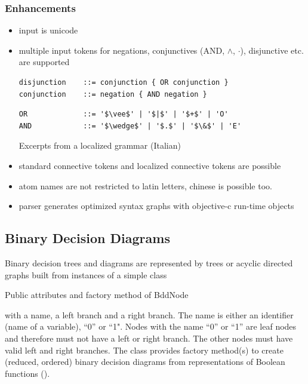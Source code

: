 \subsubsection{Enhancements}

\begin{itemize}

\item input is unicode

\item multiple input tokens for negations, conjunctives (AND, $\wedge$, $\cdot$), disjunctive etc. are supported 

\begin{table}[htdp]
\begin{center}
\begin{lstlisting}[mathescape,firstnumber=7]
disjunction    ::= conjunction { OR conjunction }
conjunction    ::= negation { AND negation }
\end{lstlisting}
\begin{lstlisting}[mathescape,firstnumber=15]
OR             ::= '$\vee$' | '$|$' | '$+$' | 'O'
AND            ::= '$\wedge$' | '$.$' | '$\&$' | 'E'
\end{lstlisting}
\caption{Excerpts from a localized grammar (Italian)}
\label{tab:LocalizedEBNF}
\end{center}
\end{table}

\item 

standard connective tokens and localized connective tokens are possible

\item atom names are not restricted to latin letters, chinese is possible too.

\item parser generates optimized syntax graphs with objective-c run-time objects

\end{itemize}




\subsection{Binary Decision Diagrams}

Binary decision trees and diagrams are represented by trees or acyclic directed graphs built from instances of a simple class
\begin{table}[htdp]
\begin{center}
\caption{Public attributes and factory method of BddNode}
\label{fig:BddNode}
\end{center}
\end{table}
 with a name, a left branch and a right branch. The name is either an identifier (name of a variable), “0” or “1". 
Nodes with the name “0” or “1” are leaf nodes and therefore must not have a left or right branch.
The other nodes must have valid left and right branches. The class provides factory method(s) to create 
(reduced, ordered) binary decision diagrams from representations of Boolean functions
().

